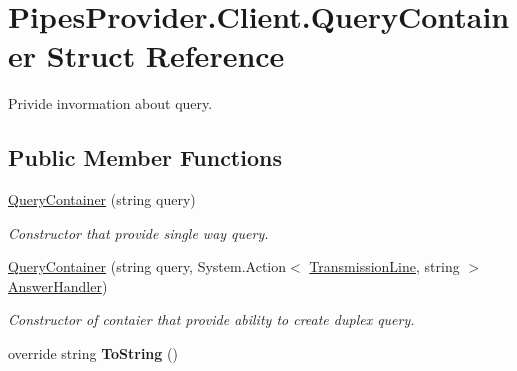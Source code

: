 \hypertarget{struct_pipes_provider_1_1_client_1_1_query_container}{}\section{Pipes\+Provider.\+Client.\+Query\+Container Struct Reference}
\label{struct_pipes_provider_1_1_client_1_1_query_container}


Privide invormation about query.  


\subsection*{Public Member Functions}
\begin{DoxyCompactItemize}
\item 
\mbox{\hyperlink{struct_pipes_provider_1_1_client_1_1_query_container_a35009271933f6aebf60be2415b651067}{Query\+Container}} (string query)
\begin{DoxyCompactList}\small\item\em Constructor that provide single way query. \end{DoxyCompactList}\item 
\mbox{\hyperlink{struct_pipes_provider_1_1_client_1_1_query_container_a0e78a9dc3d3fc971f9a1abb06dc836b4}{Query\+Container}} (string query, System.\+Action$<$ \mbox{\hyperlink{class_pipes_provider_1_1_client_1_1_transmission_line}{Transmission\+Line}}, string $>$ \mbox{\hyperlink{struct_pipes_provider_1_1_client_1_1_query_container_acaaa09658d3bb75118670fbb90b77f33}{Answer\+Handler}})
\begin{DoxyCompactList}\small\item\em Constructor of contaier that provide ability to create duplex query. \end{DoxyCompactList}\item 
\mbox{\label{struct_pipes_provider_1_1_client_1_1_query_container_a567d4d144909e8e480c30f1faacadbc3}} 
override string {\bfseries To\+String} ()
\end{DoxyCompactItemize}
